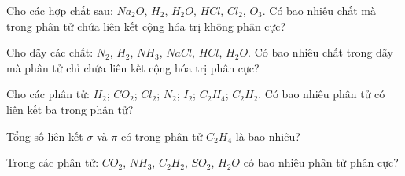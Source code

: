 \begin{bt}
	Cho các hợp chất sau: $Na_2O$, $H_2$, $H_2O$, $HCl$, $Cl_2$, $O_3$. Có bao nhiêu chất mà trong phân tử chứa liên kết cộng hóa trị không phân cực?
\end{bt}

\begin{bt}
	Cho dãy các chất: $N_2$, $H_2$, $NH_3$, $NaCl$, $HCl$, $H_2O$. Có bao nhiêu chất trong dãy mà phân tử chỉ chứa liên kết cộng hóa trị phân cực?
\end{bt}

\begin{bt}
	Cho các phân tử: $H_2$; $CO_2$; $Cl_2$; $N_2$; $I_2$; $C_2H_4$; $C_2H_2$. Có bao nhiêu phân tử có liên kết ba trong phân tử?
\end{bt}

\begin{bt} Tổng số liên kết $\sigma$ và $\pi$ có trong phân tử $C_2H_4$ là bao nhiêu?
\end{bt}

\begin{bt}
	Trong các phân tử: $CO_2$, $NH_3$, $C_2H_2$, $SO_2$, $H_2O$ có bao nhiêu phân tử phân cực?
\end{bt}

